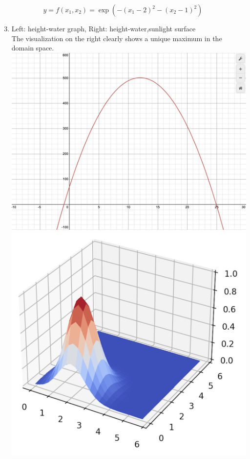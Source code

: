 \documentclass{harvardml}
\theoremstyle{definition}
\theoremstyle{plain}
\begin{document}
\begin{solution}
$$y = f(x_1, x_2) = \exp\left(-(x_1 - 2)^2 - (x_2 - 1)^2 \right)$$
\begin{enumerate}
    \setcounter{enumi}{2}
    \item Left: height-water graph, Right: height-water,sunlight surface\\
    The visualization on the right clearly shows a unique maximum in the domain space.\\
    \includegraphics[width=0.45\linewidth]{./images/P2Plant.png}
    \includegraphics[width=0.45\linewidth]{./images/P2Sunlight.png}

\end{enumerate}
\end{solution}
\end{document}
